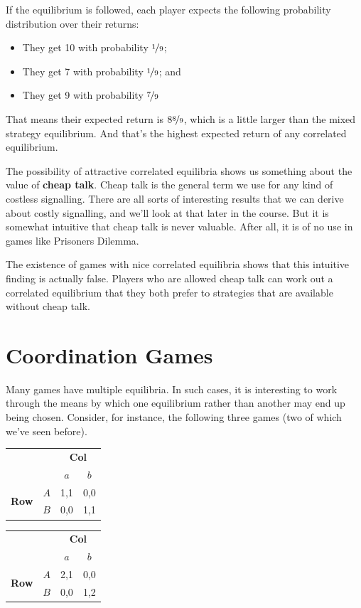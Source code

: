 \documentclass[openany]{book}
\begin{document}
If the equilibrium is followed, each player expects the following probability distribution over their returns:

\begin{itemize}
\item They get 10 with probability $\nicefrac{1}{9}$;
\item They get 7 with probability $\nicefrac{1}{9}$; and
\item They get 9 with probability $\nicefrac{7}{9}$
\end{itemize}
That means their expected return is $8\nicefrac{8}{9}$, which is a little larger than the mixed strategy equilibrium. And that's the highest expected return of any correlated equilibrium.

The possibility of attractive correlated equilibria shows us something about the value of \textbf{cheap talk}. Cheap talk is the general term we use for any kind of costless signalling. There are all sorts of interesting results that we can derive about costly signalling, and we'll look at that later in the course. But it is somewhat intuitive that cheap talk is never valuable. After all, it is of no use in games like Prisoners Dilemma.

The existence of games with nice correlated equilibria shows that this intuitive finding is actually false. Players who are allowed cheap talk can work out a correlated equilibrium that they both prefer to strategies that are available without cheap talk.

\section{Coordination Games}

Many games have multiple equilibria. In such cases, it is interesting to work through the means by which one equilibrium rather than another may end up being chosen. Consider, for instance, the following three games (two of which we've seen before).

 \begin{center}
\begin{tabular}{l r | c c}
& & \multicolumn{2}{c}{\textbf{Col}} \\
& & $a$ & $b$  \\ \hline
\multirow{2}{*}{\textbf{Row}}
& $A$ & 1,1 & 0,0 \\
& $B$ & 0,0 & 1,1
\end{tabular}
\end{center}

 \begin{center}
\begin{tabular}{l r | c c}
& & \multicolumn{2}{c}{\textbf{Col}} \\
& & $a$ & $b$  \\ \hline
\multirow{2}{*}{\textbf{Row}}
& $A$ & 2,1 & 0,0 \\
& $B$ & 0,0 & 1,2
\end{tabular}
\end{center}
\end{document}
